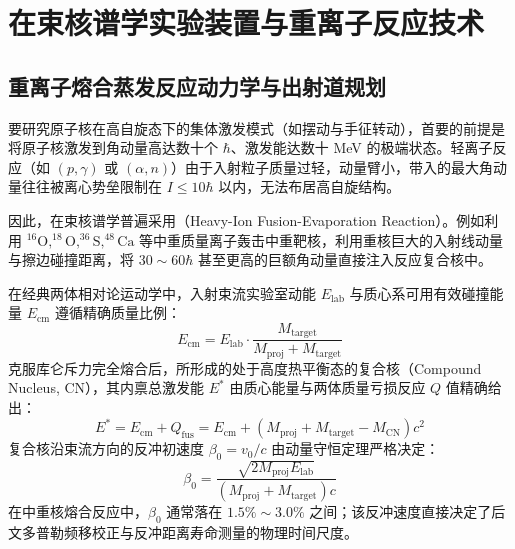 
\chapter{在束核谱学实验装置与重离子反应技术}
\label{ch:experimental_techniques}

\section{重离子熔合蒸发反应动力学与出射道规划}
\label{sec:fusion_evaporation}

要研究原子核在高自旋态下的集体激发模式（如摆动与手征转动），首要的前提是将原子核激发到角动量高达数十个 $\hbar$、激发能达数十 MeV 的极端状态。轻离子反应（如 $(p, \gamma)$ 或 $(\alpha, n)$）由于入射粒子质量过轻，动量臂小，带入的最大角动量往往被离心势垒限制在 $I \le 10\hbar$ 以内，无法布居高自旋结构。

因此，在束核谱学普遍采用（Heavy-Ion Fusion-Evaporation Reaction）。例如利用 $^{16}\text{O}, ^{18}\text{O}, ^{36}\text{S}, ^{48}\text{Ca}$ 等中重质量离子轰击中重靶核，利用重核巨大的入射线动量与擦边碰撞距离，将 $30 \sim 60\hbar$ 甚至更高的巨额角动量直接注入反应复合核中。

在经典两体相对论运动学中，入射束流实验室动能 $E_{\text{lab}}$ 与质心系可用有效碰撞能量 $E_{\text{cm}}$ 遵循精确质量比例：
\begin{equation}
    E_{\text{cm}} = E_{\text{lab}} \cdot \frac{M_{\text{target}}}{M_{\text{proj}} + M_{\text{target}}}
    \label{eq:ecm_kinematics}
\end{equation}
克服库仑斥力完全熔合后，所形成的处于高度热平衡态的复合核（Compound Nucleus, CN），其内禀总激发能 $E^*$ 由质心能量与两体质量亏损反应 $Q$ 值精确给出：
\begin{equation}
    E^* = E_{\text{cm}} + Q_{\text{fus}} = E_{\text{cm}} + \left( M_{\text{proj}} + M_{\text{target}} - M_{\text{CN}} \right) c^2
    \label{eq:compound_excitation}
\end{equation}
复合核沿束流方向的反冲初速度 $\beta_0 = v_0 / c$ 由动量守恒定理严格决定：
\begin{equation}
    \beta_0 = \frac{\sqrt{2 M_{\text{proj}} E_{\text{lab}}}}{(M_{\text{proj}} + M_{\text{target}}) c}
    \label{eq:recoil_velocity}
\end{equation}
在中重核熔合反应中，$\beta_0$ 通常落在 $1.5\% \sim 3.0\%$ 之间；该反冲速度直接决定了后文多普勒频移校正与反冲距离寿命测量的物理时间尺度。


